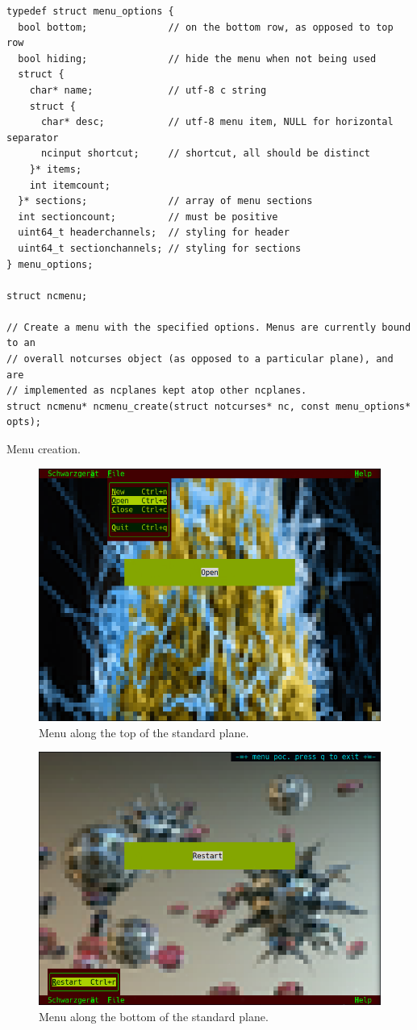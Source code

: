 \documentclass[letterpaper,10pt]{article}
\begin{document}
\begin{listing}[!htbp]
\begin{verbatim}
typedef struct menu_options {
  bool bottom;              // on the bottom row, as opposed to top row
  bool hiding;              // hide the menu when not being used
  struct {
    char* name;             // utf-8 c string
    struct {
      char* desc;           // utf-8 menu item, NULL for horizontal separator
      ncinput shortcut;     // shortcut, all should be distinct
    }* items;
    int itemcount;
  }* sections;              // array of menu sections
  int sectioncount;         // must be positive
  uint64_t headerchannels;  // styling for header
  uint64_t sectionchannels; // styling for sections
} menu_options;

struct ncmenu;

// Create a menu with the specified options. Menus are currently bound to an
// overall notcurses object (as opposed to a particular plane), and are
// implemented as ncplanes kept atop other ncplanes.
struct ncmenu* ncmenu_create(struct notcurses* nc, const menu_options* opts);
\end{verbatim}
\caption{Menu creation.}
\end{listing}

\begin{figure}
    \centering
    \includegraphics[width=.75\linewidth]{media/menutop.png}
    \caption{Menu along the top of the standard plane.}
\end{figure}

\begin{figure}
    \centering
    \includegraphics[width=.75\linewidth]{media/menubottom.png}
    \caption{Menu along the bottom of the standard plane.}
\end{figure}
\end{document}

